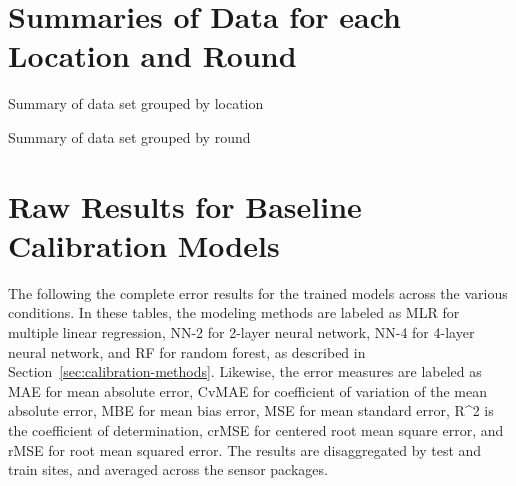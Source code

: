 \documentclass[journal abbreviation, manuscript]{copernicus}
\begin{document}
\section{Summaries of Data for each Location and Round}
\label{sec:summaryresults}

\begin{table}[H]
\scriptsize

\caption{Summary of data set grouped by location}
\label{tab:locationsummary}
\end{table}

\begin{table}[H]
\scriptsize

\caption{Summary of data set grouped by round}
\label{tab:roundsummary}
\end{table}

\section{Raw Results for Baseline Calibration Models}
\label{sec:simpleresults}
The following the complete error results for the trained models across the various conditions.  In these tables, the modeling methods are labeled as MLR for multiple linear regression, NN-2 for 2-layer neural network, NN-4 for 4-layer neural network, and RF for random forest, as described in Section~\ref{sec:calibration-methods}.  Likewise, the error measures are labeled as MAE for mean absolute error, CvMAE for coefficient of variation of the mean absolute error, MBE for mean bias error, MSE for mean standard error, R\textasciicircum2 is the coefficient of determination, crMSE for centered root mean square error, and rMSE for root mean squared error.  The results are disaggregated by test and train sites, and averaged across the sensor packages.















\end{document}
